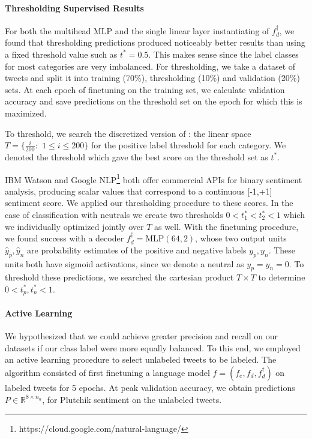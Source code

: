 \documentclass[letterpaper]{article} \usepackage{aaai19}  \usepackage{times}  \usepackage{helvet}  \usepackage{courier}  \usepackage{url}  \usepackage{graphicx}  \usepackage{booktabs}
\begin{document}
\paragraph{Thresholding Supervised Results}
For both the multihead MLP and the single linear layer instantiating of $f_d^{\dagger}$, we found that thresholding predictions produced noticeably better results than using a fixed threshold value such as $t^* = 0.5$. This makes sense since the label classes for most categories are very imbalanced. For thresholding, we take a dataset of tweets and split it into training (70\%), thresholding (10\%) and validation (20\%) sets. At each epoch of finetuning on the training set, we calculate validation accuracy and save predictions on the threshold set on the epoch for which this is maximized. 

To threshold, we search the discretized version of \text{[0, 1]}: the linear space $T = \{ \frac{i}{200}: \, \: 1 \le i \le 200 \}$ for the positive label threshold for each category. We denoted the threshold which gave the best score on the threshold set as $t^*$. 

IBM Watson and Google NLP\footnote{https://cloud.google.com/natural-language/} both offer commercial APIs for binary sentiment analysis, producing scalar values that correspond to a continuous [-1,+1] sentiment score. We applied our thresholding procedure to these scores. In the case of classification with neutrals we create two thresholds $0 < t_1^* < t_2^* < 1$ which we individually optimized jointly over $T$ as well. With the finetuning procedure, we found success with a decoder $f_d^{\dagger} = \text{MLP}(64, 2)$, whose two output units $\hat{y}_p, \hat{y}_n$ are probability estimates of the positive and negative labels $y_p, y_n$. These units both have sigmoid activations, since we denote a neutral as $y_p = y_n = 0$. To threshold these predictions, we searched the cartesian product $T \times T$ to determine $0 < t_p^*, t_n^* < 1$. 

\paragraph{Active Learning}
We hypothesized that we could achieve greater precision and recall on our datasets if our class label were more equally balanced. To this end, we employed an active learning procedure to select unlabeled tweets to be labeled. The algorithm consisted of first finetuning a language model $f = (f_e, f_d, f_d^{\dagger})$ on labeled tweets for 5 epochs. At peak validation accuracy, we obtain predictions $P \in \mathbb{R}^{8 \times n_{u}}$, for Plutchik sentiment on the unlabeled tweets. 
\end{document}
